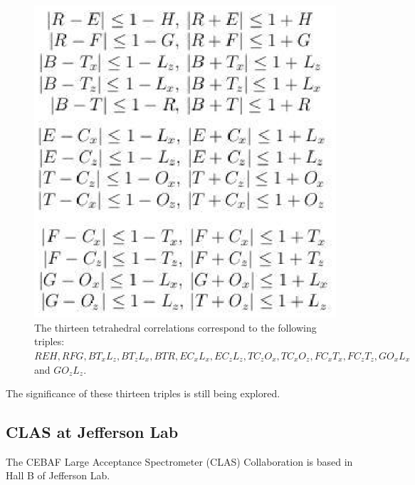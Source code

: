 \documentclass[a4paper,12pt]{article}
\begin{document}
\begin{figure}[!h]
 \begin{center}
  \includegraphics[scale=0.75]{ineqs.eps}
  \caption{The thirteen tetrahedral correlations correspond to the following triples: $REH, RFG, BT_{x}L_{z}, BT_{z}L_{x}, BTR, EC_{x}L_{x}, EC_{z}L_{z}, TC_{z}O_{x}, TC_{x}O_{z}, FC_{x}T_{x}, FC_{z}T_{z}, GO_{x}L_{x}$ and $GO_{z}L_{z}$.}
 \end{center}
\end{figure}

The significance of these thirteen triples is still being explored.

\subsection{CLAS at Jefferson Lab}
The CEBAF Large Acceptance Spectrometer (CLAS) Collaboration is based in Hall B of Jefferson Lab.  
\end{document}
